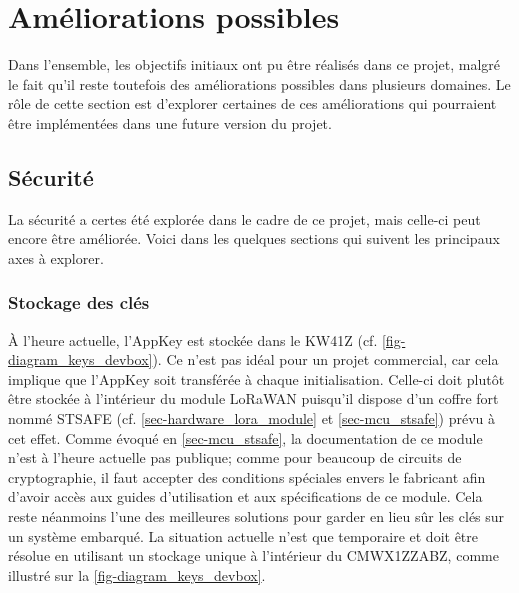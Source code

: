\section{Améliorations possibles}
\label{sec-discuss_enhancements}

Dans l'ensemble, les objectifs initiaux ont pu être réalisés dans ce projet, malgré le fait qu'il reste toutefois des améliorations possibles dans plusieurs domaines. Le rôle de cette section est d'explorer certaines de ces améliorations qui pourraient être implémentées dans une future version du projet.

\subsection{Sécurité}

La sécurité a certes été explorée dans le cadre de ce projet, mais celle-ci peut encore être améliorée. Voici dans les quelques sections qui suivent les principaux axes à explorer.

\subsubsection{Stockage des clés}

À l'heure actuelle, l'AppKey est stockée dans le KW41Z (cf. \cref{fig-diagram_keys_devbox}). Ce n'est pas idéal pour un projet commercial, car cela implique que l'AppKey soit transférée à chaque initialisation. Celle-ci doit plutôt être stockée à l'intérieur du module LoRaWAN puisqu'il dispose d'un coffre fort nommé STSAFE (cf. \cref{sec-hardware_lora_module} et \cref{sec-mcu_stsafe}) prévu à cet effet. Comme évoqué en \cref{sec-mcu_stsafe}, la documentation de ce module n'est à l'heure actuelle pas publique; comme pour beaucoup de circuits de cryptographie, il faut accepter des conditions spéciales envers le fabricant afin d'avoir accès aux guides d'utilisation et aux spécifications de ce module. Cela reste néanmoins l'une des meilleures solutions pour garder en lieu sûr les clés sur un système embarqué.
La situation actuelle n'est que temporaire et doit être résolue en utilisant un stockage unique à l'intérieur du CMWX1ZZABZ, comme illustré sur la \cref{fig-diagram_keys_devbox}.

